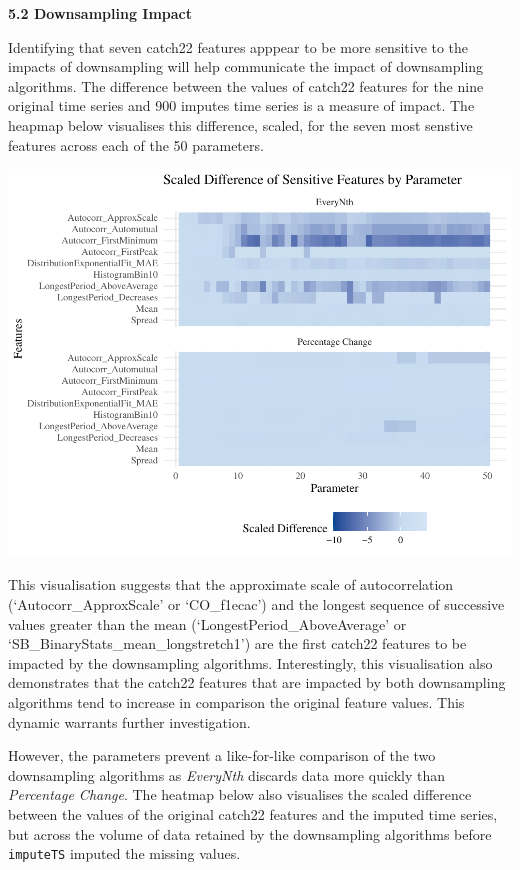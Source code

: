 \documentclass{article}
\begin{document}
\textbf{5.2 Downsampling Impact}

Identifying that seven catch22 features apppear to be more sensitive to
the impacts of downsampling will help communicate the impact of
downsampling algorithms. The difference between the values of catch22
features for the nine original time series and 900 imputes time series
is a measure of impact. The heapmap below visualises this difference,
scaled, for the seven most senstive features across each of the 50
parameters.

\includegraphics{210431461_CSC8639_Dissertation_files/figure-latex/Heatmap_param-1.pdf}

This visualisation suggests that the approximate scale of
autocorrelation (`Autocorr\_ApproxScale' or `CO\_f1ecac') and the
longest sequence of successive values greater than the mean
(`LongestPeriod\_AboveAverage' or `SB\_BinaryStats\_mean\_longstretch1')
are the first catch22 features to be impacted by the downsampling
algorithms. Interestingly, this visualisation also demonstrates that the
catch22 features that are impacted by both downsampling algorithms tend
to increase in comparison the original feature values. This dynamic
warrants further investigation.

However, the parameters prevent a like-for-like comparison of the two
downsampling algorithms as \emph{EveryNth} discards data more quickly
than \emph{Percentage Change}. The heatmap below also visualises the
scaled difference between the values of the original catch22 features
and the imputed time series, but across the volume of data retained by
the downsampling algorithms before \texttt{imputeTS} imputed the missing
values.
\end{document}
